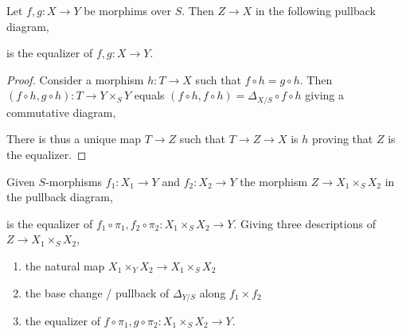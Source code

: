 \documentclass[12pt]{article}
\begin{document}
\begin{lemma}
Let $f,g : X \to Y$ be morphims over $S$. Then $Z \to X$ in the following pullback diagram,
\begin{center}
\end{center}
is the equalizer of $f, g : X \to Y$.
\end{lemma}

\begin{proof}
Consider a morphism $h : T \to X$ such that $f \circ h = g \circ h$. Then $(f \circ h, g \circ h) : T \to Y \times_S Y$ equals $(f \circ h, f \circ h) = \Delta_{X/S} \circ f \circ h$ giving a commutative diagram,
\begin{center}
\end{center}
There is thus a unique map $T \to Z$ such that $T \to Z \to X$ is $h$ proving that $Z$ is the equalizer.
\end{proof}

\begin{cor}
Given $S$-morphisms $f_1 : X_1 \to Y$ and $f_2 : X_2 \to Y$ the morphism $Z \to X_1 \times_S X_2$ in the pullback diagram,
\begin{center}
\end{center}
is the equalizer of $f_1 \circ \pi_1, f_2 \circ \pi_2 : X_1 \times_S X_2 \to Y$. Giving three descriptions of $Z \to X_1 \times_S X_2$,
\begin{enumerate}
\item the natural map $X_1 \times_Y X_2 \to X_1 \times_S X_2$
\item the base change / pullback of $\Delta_{Y/S}$ along $f_1 \times f_2$
\item the equalizer of $f \circ \pi_1, g \circ \pi_2 : X_1 \times_S X_2 \to Y$.
\end{enumerate}
\end{cor}
\end{document}
